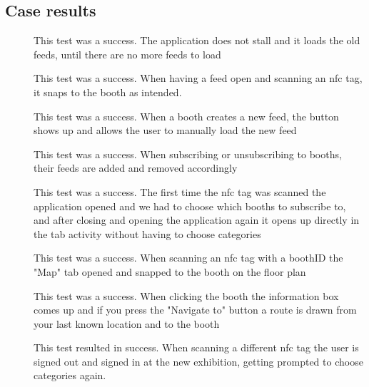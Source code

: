 \subsection*{Case results}
\begin{description}
\item[\casetwo] This test was a success. The application does not stall and it loads the old feeds, until there are no more feeds to load
\item[\casethree] This test was a success. When having a feed open and scanning an \ac{nfc} tag, it snaps to the booth as intended.
\item[\casefour] This test was a success. When a booth creates a new feed, the button shows up and allows the user to manually load the new feed
\item[\casefive] This test was a success. When subscribing or unsubscribing to booths, their feeds are added and removed accordingly 
\item[\casesix] This test was a success. The first time the \ac{nfc} tag was scanned the application opened and we had to choose which booths to subscribe to, and after closing and opening the application again it opens up directly in the tab activity without having to choose categories
\item[\caseseven] This test was a success. When scanning an \ac{nfc} tag with a boothID the "Map" tab opened and snapped to the booth on the floor plan
\item[\caseeight] This test was a success. When clicking the booth the information box comes up and if  you press the "Navigate to" button a route is drawn from your last known location and to the booth
\item[\casenine] This test resulted in success. When scanning a different \ac{nfc} tag the user is signed out and signed in at the new exhibition, getting prompted to choose categories again.
\end{description}
